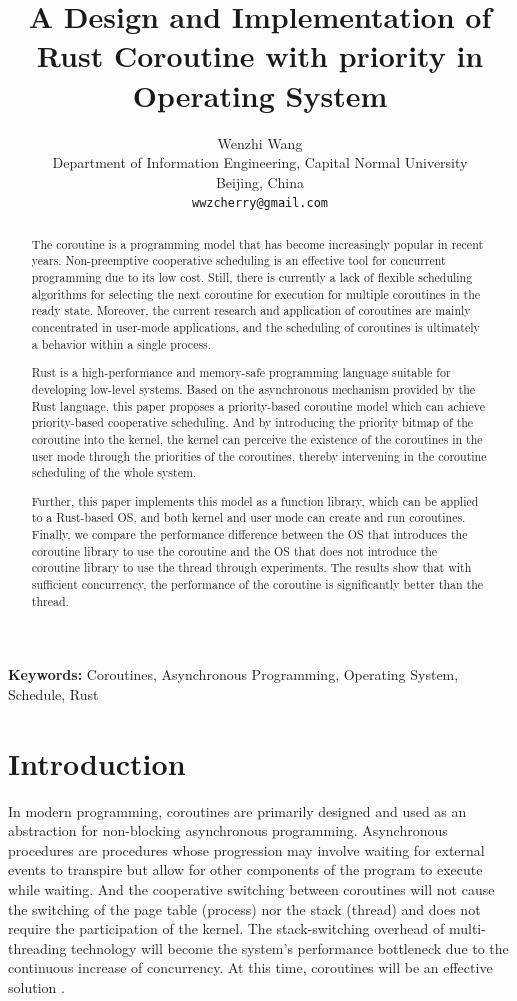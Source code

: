 \documentclass[10pt]{article}
\title{A Design and Implementation of Rust Coroutine with priority in Operating System}
\author{
  Wenzhi Wang \\
  Department of Information Engineering, Capital Normal University \\
  Beijing, China \\
  {\tt wwzcherry@gmail.com}}
\date{}
\begin{document}
\maketitle
\begin{abstract}
The coroutine is a programming model that has become increasingly popular in recent years. Non-preemptive cooperative scheduling is an effective tool for concurrent programming due to its low cost. Still, there is currently a lack of flexible scheduling algorithms for selecting the next coroutine for execution for multiple coroutines in the ready state. Moreover, the current research and application of coroutines are mainly concentrated in user-mode applications, and the scheduling of coroutines is ultimately a behavior within a single process. 

Rust is a high-performance and memory-safe programming language suitable for developing low-level systems. Based on the asynchronous mechanism provided by the Rust language, this paper proposes a priority-based coroutine model which can achieve priority-based cooperative scheduling. And by introducing the priority bitmap of the coroutine into the kernel, the kernel can perceive the existence of the coroutines in the user mode through the priorities of the coroutines, thereby intervening in the coroutine scheduling of the whole system.

Further, this paper implements this model as a function library, which can be applied to a Rust-based OS, and both kernel and user mode can create and run coroutines. Finally, we compare the performance difference between the OS that introduces the coroutine library to use the coroutine and the OS that does not introduce the coroutine library to use the thread through experiments. The results show that with sufficient concurrency, the performance of the coroutine is significantly better than the thread.
\end{abstract}

{\bf Keywords:} Coroutines, Asynchronous Programming, Operating System, Schedule, Rust

\section{Introduction}

In modern programming, coroutines are primarily designed and used as an abstraction for non-blocking asynchronous programming. Asynchronous procedures \cite{waern2021coroutines} are procedures whose progression may involve waiting for external events to transpire but allow for other components of the program to execute while waiting. And the cooperative switching between coroutines will not cause the switching of the page table (process) nor the stack (thread) and does not require the participation of the kernel. The stack-switching overhead of multi-threading technology will become the system's performance bottleneck due to the continuous increase of concurrency. At this time, coroutines will be an effective solution \cite{belson2019survey} .
\end{document}
